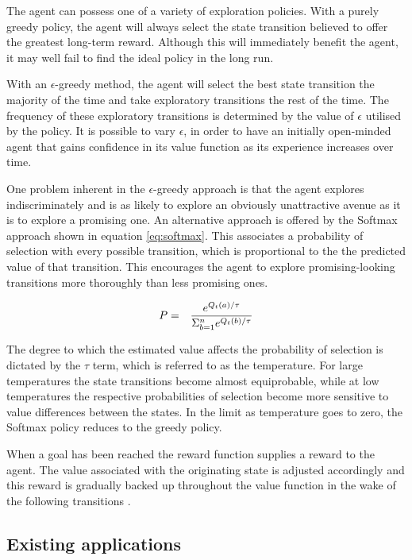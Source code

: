 \documentclass{rucsthesis}
\begin{document}
The agent can possess one of a variety of exploration policies. With a purely greedy policy, the agent will always select the state transition believed to offer the greatest long-term reward. Although this will immediately benefit the agent, it may well fail to find the ideal policy in the long run. 

With an $\epsilon$-greedy method, the agent will select the best state transition the majority of the time and take exploratory transitions the rest of the time. The frequency of these exploratory transitions is determined by the value of $\epsilon$ utilised by the policy. It is possible to vary $\epsilon$, in order to have an initially open-minded agent that gains confidence in its value function as its experience increases over time. 

One problem inherent in the $\epsilon$-greedy approach is that the agent explores indiscriminately and is as likely to explore an obviously unattractive avenue as it is to explore a promising one. An alternative approach is offered by the Softmax approach shown in equation \ref{eq:softmax}. This associates a probability of selection with every possible transition, which is proportional to the the predicted value of that transition. This encourages the agent to explore promising-looking transitions more thoroughly than less promising ones.

\begin{eqnarray}
\centering
P & = & \frac{e^{Q_{t}(a)/\tau}}{\Sigma_{b=1}^{n}e^{Q_{t}(b)/\tau}} \label{eq:softmax}
\end{eqnarray}

The degree to which the estimated value affects the probability of selection is dictated by the $\tau$ term, which is referred to as the temperature. For large temperatures the state transitions become almost equiprobable, while at low temperatures the respective probabilities of selection become more sensitive to value differences between the states.  In the limit as temperature goes to zero, the Softmax policy reduces to the greedy policy.

When a goal has been reached the reward function supplies a reward to the agent.  The value associated with the originating state is adjusted accordingly and this reward is gradually backed up throughout the value function in the wake of the following transitions \citep{suttonbarto}.

\subsection{Existing applications}
\end{document}
